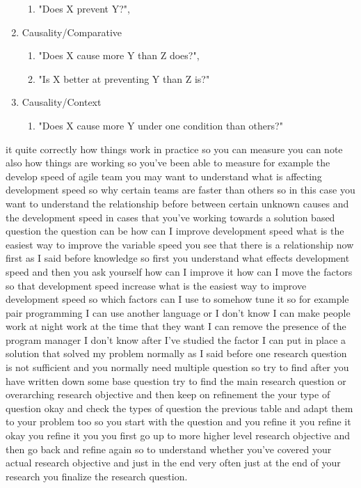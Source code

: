 \documentclass[conference, compsoc, twoside]{IEEEtran}
\begin{document}
\begin{enumerate}
\begin{enumerate}
		\item "Does X prevent Y?",
	\end{enumerate}
	\item Causality/Comparative 
	\begin{enumerate}
		\item "Does X cause more Y than Z does?",
		\item "Is X better at preventing Y than Z is?"
	\end{enumerate}
	\item Causality/Context 
	\begin{enumerate}
		\item "Does X cause more Y under one condition than others?"
	\end{enumerate}

\end{enumerate}
 it quite correctly how things work in practice so you can measure you can note also how things are working so you've been able to measure for example the develop speed of agile team you may want to understand what is affecting development speed so why certain teams are faster than others so in this case you want to understand the relationship before between certain unknown causes and the development speed in cases that you've working towards a solution based question the question can be how can I improve development speed what is the easiest way to improve the variable speed you see that there is a relationship now first as I said before knowledge so first you understand what effects development speed and then you ask yourself how can I improve it how can I move the factors so that development speed increase what is the easiest way to improve development speed so which factors can I use to somehow tune it so for example pair programming I can use another language or I don't know I can make people work at night work at the time that they want I can remove the presence of the program manager I don't know after I've studied the factor I can put in place a solution that solved my problem normally as I said before one research question is not sufficient and you normally need multiple question so try to find after you have written down some base question try to find the main research question or overarching research objective and then keep on refinement the your type of question okay and check the types of question the previous table and adapt them to your problem too so you start with the question and you refine it you refine it okay you refine it you you first go up to more higher level research objective and then go back and refine again so to understand whether you've covered your actual research objective and just in the end very often just at the end of your research you finalize the research question.
\end{document}
